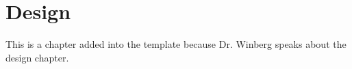 \chapter{Design}
\label{ch_design}

This is a chapter added into the template because Dr. Winberg speaks about the design chapter.

